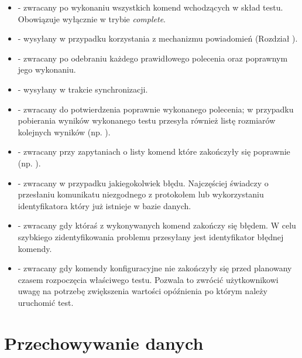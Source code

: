 \documentclass[00-praca-magisterska.tex]{subfiles}
\begin{document}
\begin{itemize}
  \setlength{\itemsep}{10pt}

\item{ - zwracany po wykonaniu wszystkich komend
wchodzących w skład testu. Obowiązuje wyłącznie w trybie \emph{complete}.}

\item{ - wysyłany w
przypadku korzystania z mechanizmu powiadomień (Rozdział ).}

\item{ - zwracany po odebraniu każdego prawidłowego polecenia oraz
poprawnym jego wykonaniu.}

\item{ - wysyłany w trakcie synchronizacji.}

\item{ - zwracany do potwierdzenia poprawnie wykonanego
polecenia; w przypadku pobierania wyników wykonanego testu przesyła również
listę rozmiarów kolejnych wyników (np. ).}

\item{ - zwracany przy zapytaniach o listy
komend które zakończyły się poprawnie (np. ).}

\item{ - zwracany w przypadku jakiegokolwiek błędu. Najczęściej
świadczy o przesłaniu komunikatu niezgodnego z protokołem lub wykorzystaniu
identyfikatora który już istnieje w bazie danych.}

\item{ - zwracany gdy któraś z wykonywanych
komend zakończy się błędem. W celu szybkiego zidentyfikowania problemu
przesyłany jest identyfikator błędnej komendy.}

\item{ - zwracany gdy komendy konfiguracyjne nie zakończyły
się przed planowany czasem rozpoczęcia właściwego testu. Pozwala to zwrócić
użytkownikowi uwagę na potrzebę zwiększenia wartości opóźnienia po którym
należy uruchomić test.}

\end{itemize}

\section{Przechowywanie danych}
\label{arete-slave-db}
\end{document}
